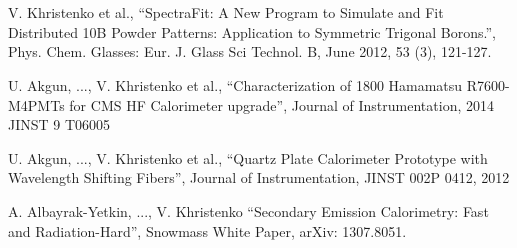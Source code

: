 \documentclass[11pt, letterpaper]{deps1}
\begin{document}
 \\
 \vspace{-10pt}\\

\begin{tightitemize}
    \item V. Khristenko et al., ``SpectraFit: A New Program to Simulate and Fit Distributed 10B Powder Patterns: Application to Symmetric Trigonal Borons.'', Phys. Chem. Glasses: Eur. J. Glass Sci Technol. B, June 2012, 53 (3), 121-127.
    \item U. Akgun, ..., V. Khristenko et al., ``Characterization of 1800 Hamamatsu R7600-M4PMTs for CMS HF Calorimeter upgrade'', Journal of Instrumentation, 2014 JINST 9 T06005
    \item U. Akgun, ..., V. Khristenko et al., ``Quartz Plate Calorimeter Prototype with Wavelength Shifting Fibers'', Journal of Instrumentation, JINST 002P 0412, 2012
    \item A. Albayrak-Yetkin, ..., V. Khristenko ``Secondary Emission Calorimetry: Fast and Radiation-Hard'', Snowmass White Paper, arXiv: 1307.8051.
\end{tightitemize}
\end{document}

